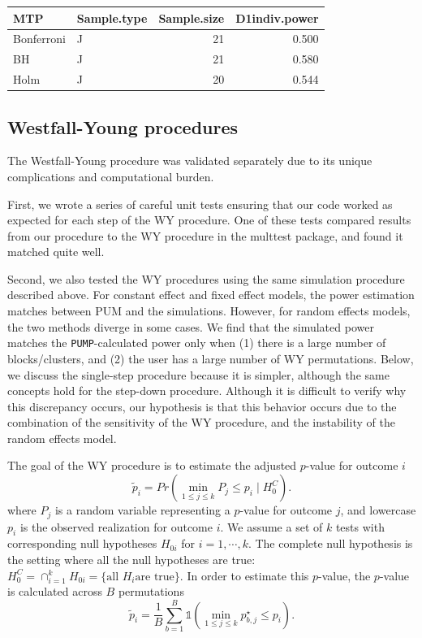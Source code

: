 \documentclass[
]{article}
\begin{document}
\begin{tabular}{l|l|r|r}
\hline
MTP & Sample.type & Sample.size & D1indiv.power\\
\hline
Bonferroni & J & 21 & 0.500\\
\hline
BH & J & 21 & 0.580\\
\hline
Holm & J & 20 & 0.544\\
\hline
\end{tabular}

\hypertarget{westfall-young-procedures}{%
\subsection{Westfall-Young procedures}\label{westfall-young-procedures}}

The Westfall-Young procedure was validated separately due to its unique
complications and computational burden.

First, we wrote a series of careful unit tests ensuring that our code
worked as expected for each step of the WY procedure. One of these tests
compared results from our procedure to the WY procedure in the multtest
package, and found it matched quite well.

Second, we also tested the WY procedures using the same simulation
procedure described above. For constant effect and fixed effect models,
the power estimation matches between PUM and the simulations. However,
for random effects models, the two methods diverge in some cases. We
find that the simulated power matches the \texttt{PUMP}-calculated power
only when (1) there is a large number of blocks/clusters, and (2) the
user has a large number of WY permutations. Below, we discuss the
single-step procedure because it is simpler, although the same concepts
hold for the step-down procedure. Although it is difficult to verify why
this discrepancy occurs, our hypothesis is that this behavior occurs due
to the combination of the sensitivity of the WY procedure, and the
instability of the random effects model.

The goal of the WY procedure is to estimate the adjusted \(p\)-value for
outcome \(i\)
\[\tilde{p}_i = Pr\left(\min_{1 \leq j \leq k} P_j \leq p_i \mid H_0^C\right).\]
where \(P_j\) is a random variable representing a \(p\)-value for
outcome \(j\), and lowercase \(p_i\) is the observed realization for
outcome \(i\). We assume a set of \(k\) tests with corresponding null
hypotheses \(H_{0i}\) for \(i = 1, \cdots, k\). The complete null
hypothesis is the setting where all the null hypotheses are true:
\(H_0^C = \cap_{i=1}^{k} H_{0i} = \{\text{all } H_i \text{are true}\}\).
In order to estimate this \(p\)-value, the \(p\)-value is calculated
across \(B\) permutations
\[\tilde{p}_i = \frac{1}{B}\sum_{b = 1}^{B} \mathbb{1}(\min_{1 \leq j \leq k} p_{b,j}^\star \leq p_i).\]
\end{document}
